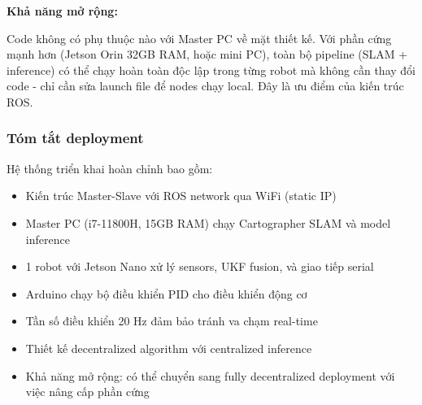 \textbf{Khả năng mở rộng:}

Code không có phụ thuộc nào với Master PC về mặt thiết kế. Với phần cứng mạnh hơn (Jetson Orin 32GB RAM, hoặc mini PC), toàn bộ pipeline (SLAM + inference) có thể chạy hoàn toàn độc lập trong từng robot mà không cần thay đổi code - chỉ cần sửa launch file để nodes chạy local. Đây là ưu điểm của kiến trúc ROS.

\subsubsection{Tóm tắt deployment}

Hệ thống triển khai hoàn chỉnh bao gồm:
\begin{itemize}[nosep]
\item Kiến trúc Master-Slave với ROS network qua WiFi (static IP)
\item Master PC (i7-11800H, 15GB RAM) chạy Cartographer SLAM và model inference
\item 1 robot với Jetson Nano xử lý sensors, UKF fusion, và giao tiếp serial
\item Arduino chạy bộ điều khiển PID cho điều khiển động cơ
\item Tần số điều khiển 20 Hz đảm bảo tránh va chạm real-time 
\item Thiết kế decentralized algorithm với centralized inference
\item Khả năng mở rộng: có thể chuyển sang fully decentralized deployment với việc nâng cấp phần cứng
\end{itemize}

